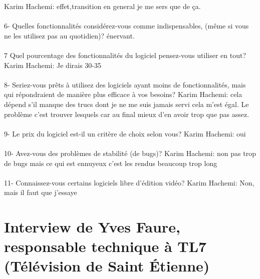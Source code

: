 Karim Hachemi: effet,transition en general je me sers que de ça.

\paragraph{}
6-  Quelles fonctionnalités considérez-vous comme indispensables, (même si vous
ne les utilisez pas au quotidien)?
énervant.

\paragraph{}
7 Quel pourcentage des fonctionnalités du logiciel pensez-vous utiliser
en tout?
Karim Hachemi: Je dirais 30-35%

\paragraph{}
8- Seriez-vous prêts à utilisez des logiciels ayant moins de fonctionnalités,
mais qui répondraient de manière plus efficace à vos besoins?
Karim Hachemi: cela dépend s'il manque des trucs dont je ne me
suis jamais servi cela m'est égal. Le problème c'est
trouver lesquels car au final mieux d'en avoir trop que pas assez.

\paragraph{}
9-  Le prix du logiciel est-il un critère de choix selon vous?
Karim Hachemi: oui

\paragraph{}
10- Avez-vous des problèmes de stabilité (de bugs)?
Karim Hachemi: non pas trop de bugs mais ce qui est ennuyeux c'est les
rendus beaucoup trop long

\paragraph{}
11- Connaissez-vous certains logiciels libre d'édition vidéo?
Karim Hachemi: Non, mais il faut que j'essaye

\section*{Interview de Yves Faure,  responsable technique à TL7
(Télévision de Saint Étienne)}

